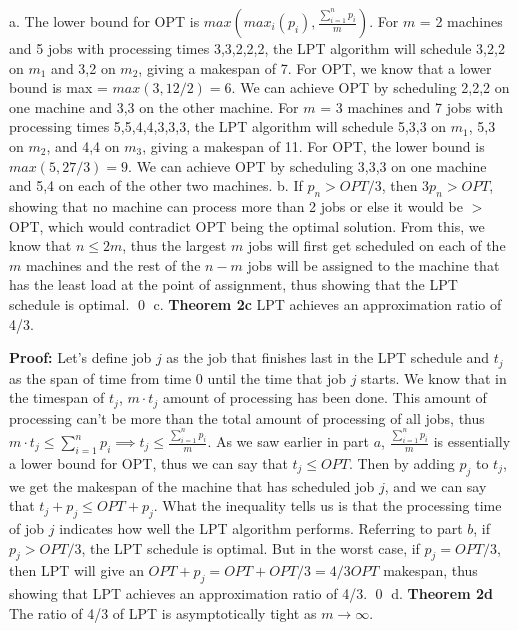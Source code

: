 \documentclass[oneside]{homework} %
\begin{document}
{\large a.} The lower bound for OPT is $max(max_i(p_i), \frac{\sum\limits_{i=1}^{n}p_i}{m})$. 
\newline
\newline
For $m$ = 2 machines and 5 jobs with processing times 3,3,2,2,2, the LPT algorithm will schedule 3,2,2 on $m_1$ and 3,2 on $m_2$, giving a makespan of 7. For OPT, we know that a lower bound is max = $max(3, 12/2) = 6$. We can achieve OPT by scheduling 2,2,2 on one machine and 3,3 on the other machine.
\newline
\newline
For $m$ = 3 machines and 7 jobs with processing times 5,5,4,4,3,3,3, the LPT algorithm will schedule 5,3,3 on $m_1$, 5,3 on $m_2$, and 4,4 on $m_3$, giving a makespan of 11. For OPT, the lower bound is $max(5, 27/3) = 9$. We can achieve OPT by scheduling 3,3,3 on one machine and 5,4 on each of the other two machines.
\newline
\newline
{\large b.} If $p_n > OPT/3$, then $3p_n > OPT$, showing that no machine can process more than 2 jobs or else it would be $>$ OPT, which would contradict OPT being the optimal solution. From this, we know that $n \leq 2m$, thus the largest $m$ jobs will first get scheduled on each of the $m$ machines and the rest of the $n - m$ jobs will be assigned to the machine that has the least load at the point of assignment, thus showing that the LPT schedule is optimal. \hfill\qed
\newline
\newline
{\large c.} \textbf{Theorem 2c} LPT achieves an approximation ratio of 4/3.
\newline

\textbf{Proof:} Let's define job $j$ as the job that finishes last in the LPT schedule and $t_j$ as the span of time from time 0 until the time that job $j$ starts. We know that in the timespan of $t_j$, $m\cdot t_j$ amount of processing has been done. This amount of processing can't be more than the total amount of processing of all jobs, thus $m \cdot t_j \leq \sum\limits_{i=1}^{n}p_i \implies t_j \leq \frac{\sum\limits_{i=1}^{n}p_i}{m}$. As we saw earlier in part $a$, $\frac{\sum\limits_{i=1}^{n}p_i}{m}$ is essentially a lower bound for OPT, thus we can say that $t_j \leq OPT$. Then by adding $p_j$ to $t_j$, we get the makespan of the machine that has scheduled job $j$, and we can say that $t_j + p_j \leq OPT + p_j$. What the inequality tells us is that the processing time of job $j$ indicates how well the LPT algorithm performs. Referring to part $b$, if $p_j > OPT/3$, the LPT schedule is optimal. But in the worst case, if $p_j = OPT/3$, then LPT will give an $OPT + p_j = OPT + OPT/3 = 4/3 OPT$ makespan, thus showing that LPT achieves an approximation ratio of 4/3. \hfill\qed
\newline
\newline
{\large d.} \textbf{Theorem 2d} The ratio of 4/3 of LPT is asymptotically tight as $m \rightarrow \infty$.
\newline
\end{document}
